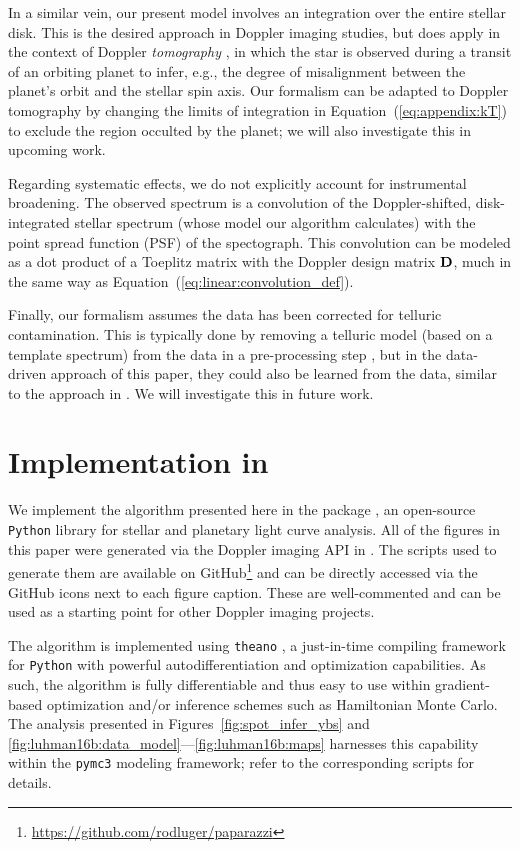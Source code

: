 \documentclass[modern]{aastex631}
\begin{document}
In a similar vein, our present model involves an integration over the entire stellar disk. 
This is the desired approach in Doppler imaging studies, but does apply in the context of Doppler \emph{tomography} \citep[e.g.,][]{Johnson2017}, in which the star is observed during a transit of an orbiting planet to infer, e.g., the degree of misalignment between the planet's orbit and the stellar spin axis.
Our formalism can be adapted to Doppler tomography by changing the limits of integration in Equation~(\ref{eq:appendix:kT}) to exclude the region occulted by the planet; we will also investigate this in upcoming work.

Regarding systematic effects, we do not explicitly account for instrumental broadening. 
The observed spectrum is a convolution of the Doppler-shifted, disk-integrated stellar spectrum (whose model our algorithm calculates) with the point spread function (PSF) of the spectograph.
This convolution can be modeled as a dot product of a Toeplitz matrix with the Doppler design matrix ${\mathbf{D}}$, much in the same way as Equation~(\ref{eq:linear:convolution_def}).

Finally, our formalism assumes the data has been corrected for telluric contamination. 
This is typically done by removing a telluric model (based on a template spectrum) from the data in a pre-processing step \citep[as in][]{Crossfield2014}, but in the data-driven approach of this paper, they could also be learned from the data, similar to the approach in \citet{Bedell2019}.
We will investigate this in future work.

\section{Implementation in \starry}
\label{sec:starry}

We implement the algorithm presented here in the \starry package \citep{Luger2019,Luger2021c}, an open-source \texttt{Python} library for stellar and planetary light curve analysis. 
All of the figures in this paper were generated via the Doppler imaging API in \starry. 
The scripts used to generate them are available on GitHub\footnote{\url{https://github.com/rodluger/paparazzi}} and can be directly accessed via the GitHub icons next to each figure caption.
These are well-commented and can be used as a starting point for other Doppler imaging projects.

The algorithm is implemented using \texttt{theano} \citep{Bergstra2010}, a just-in-time compiling framework for \texttt{Python} with powerful autodifferentiation and optimization capabilities.
As such, the algorithm is fully differentiable and thus easy to use within gradient-based optimization and/or inference schemes such as Hamiltonian Monte Carlo.
The analysis presented in Figures~\ref{fig:spot_infer_ybs} and \ref{fig:luhman16b:data_model}---\ref{fig:luhman16b:maps} harnesses this capability within the \texttt{pymc3} modeling framework; refer to the corresponding scripts for details.
\end{document}
